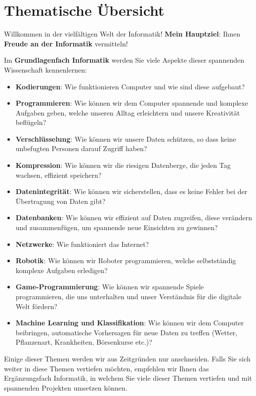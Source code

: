 \maketitle

\section*{\textcolor{FDUteal}{Thematische Übersicht}}
Willkommen in der vielfältigen Welt der Informatik! \textbf{Mein Hauptziel}: Ihnen \textbf{Freude an der Informatik} vermitteln! 

Im \textbf{Grundlagenfach Informatik} werden Sie viele Aspekte dieser spannenden Wissenschaft kennenlernen:

\begin{itemize}
	\item \textbf{Kodierungen}: Wie funktionieren Computer und wie sind diese aufgebaut?
	\item \textbf{Programmieren}: Wie können wir dem Computer spannende und komplexe Aufgaben geben, welche unseren Alltag erleichtern und unsere Kreativität beflügeln?
	\item \textbf{Verschlüsselung}: Wie können wir unsere Daten schützen, so dass keine unbefugten Personen darauf Zugriff haben?
	\item \textbf{Kompression}: Wie können wir die riesigen Datenberge, die jeden Tag wachsen, effizient speichern?
	\item \textbf{Datenintegrität}: Wie können wir sicherstellen, dass es keine Fehler bei der Übertragung von Daten gibt?
	\item \textbf{Datenbanken}: Wie können wir effizient auf Daten zugreifen, diese verändern und zusammenfügen, um spannende neue Einsichten zu gewinnen?
	\item \textbf{Netzwerke}: Wie funktioniert das Internet?
	\item \textbf{Robotik}: Wie können wir Roboter programmieren, welche selbstständig komplexe Aufgaben erledigen?
	\item \textbf{Game-Programmierung}: Wie können wir spannende Spiele programmieren, die uns unterhalten und unser Verständnis für die digitale Welt fördern?
	\item \textbf{Machine Learning und Klassifikation}: Wie können wir dem Computer beibringen, automatische Vorhersagen für neue Daten zu treffen (Wetter, Pflanzenart, Krankheiten, Börsenkurse etc.)?
\end{itemize}

Einige dieser Themen werden wir aus Zeitgründen nur anschneiden. Falls Sie sich weiter in diese Themen vertiefen möchten, empfehlen wir Ihnen das Ergänzungsfach Informatik, in welchem Sie viele dieser Themen vertiefen und mit spannenden Projekten umsetzen können.

